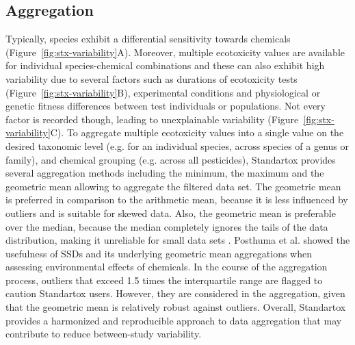 \documentclass[journal,datadescriptor,submit,moreauthors,pdftex]{Definitions/mdpi}
\begin{document}
\subsection{Aggregation}
Typically, species exhibit a differential sensitivity towards chemicals (Figure~\ref{fig:stx-variability}A). Moreover, multiple ecotoxicity values are available for individual species-chemical combinations and these can also exhibit high variability due to several factors such as durations of ecotoxicity tests (Figure~\ref{fig:stx-variability}B), experimental conditions and physiological or genetic fitness differences between test individuals or populations. Not every factor is recorded though, leading to unexplainable variability (Figure~\ref{fig:stx-variability}C). To aggregate multiple ecotoxicity values into a single value on the desired taxonomic level (e.g. for an individual species, across species of a genus or family), and chemical grouping (e.g. across all pesticides), Standartox provides several aggregation methods including the minimum, the maximum and the geometric mean allowing to aggregate the filtered data set. The geometric mean is preferred in comparison to the arithmetic mean, because it is less influenced by outliers and is suitable for skewed data. Also, the geometric mean is preferable over the median, because the median completely ignores the tails of the data distribution, making it unreliable for small data sets \citep{leith_comparison_2010}. Posthuma et al. \citet{posthuma_species_2019} showed the usefulness of SSDs and its underlying geometric mean aggregations when assessing environmental effects of chemicals. In the course of the aggregation process, outliers that exceed 1.5 times the interquartile range are flagged to caution Standartox users. However, they are considered in the aggregation, given that the geometric mean is relatively robust against outliers. Overall, Standartox provides a harmonized and reproducible approach to data aggregation that may contribute to reduce between-study variability.
\end{document}

